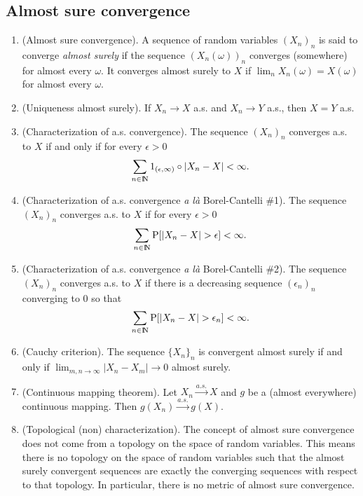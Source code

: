 \documentclass[a4paper,10pt]{scrbook}
\begin{document}
\subsection{Almost sure convergence}
\begin{enumerate}
 \item (Almost sure convergence). A sequence of random variables $(X_n)_n$ is said to converge \textit{almost surely}
       if the sequence $(X_n(\omega))_n$ converges (somewhere) for almost every $\omega$. It converges almost surely to $X$
       if $\lim_n X_n(\omega) = X(\omega)$ for almost every $\omega$.
              
       
 \item (Uniqueness almost surely). If $X_n \to X$ a.s. and $X_n \to Y$ a.s., then $X=Y$ a.s.
 
 \item (Characterization of a.s. convergence). The sequence $(X_n)_n$ converges a.s. to $X$ if and only if for every $\epsilon>0$
       \[
        \sum_{n\in\N}1_{(\epsilon,\infty)}\circ|X_n - X| < \infty.
       \]

 \item (Characterization of a.s. convergence \textit{a l\`a} Borel-Cantelli \#1).
       The sequence $(X_n)_n$ converges a.s. to $X$ if for every $\epsilon>0$
       \[
        \sum_{n\in\N}\prob[|X_n-X|>\epsilon] < \infty.
       \]

 \item (Characterization of a.s. convergence \textit{a l\`a} Borel-Cantelli \#2).
       The sequence $(X_n)_n$ converges a.s. to $X$ if there is a decreasing sequence $(\epsilon_n)_n$
       converging to $0$ so that 
       \[
        \sum_{n\in\N}\prob[|X_n-X|>\epsilon_n] < \infty.
       \]     
       
 \item (Cauchy criterion). The sequence $\{X_n\}_n$ is convergent almost surely if and only if
       $\lim_{m,n\to \infty}|X_n-X_m|\to 0$ almost surely.
       
 \item (Continuous mapping theorem). Let $X_n \overset{a.s.}{\to} X$ and $g$ be a (almost everywhere)
       continuous mapping. Then
       $g(X_n) \overset{a.s.}{\to} g(X)$.
       
 \item (Topological (non) characterization).
       The concept of almost sure convergence does not come from a topology on the space 
       of random variables. This means there is no topology on the space of random variables 
       such that the almost surely convergent sequences are exactly the converging sequences 
       with respect to that topology. In particular, there is no metric of almost sure convergence.        
              
\end{enumerate}
\end{document}
